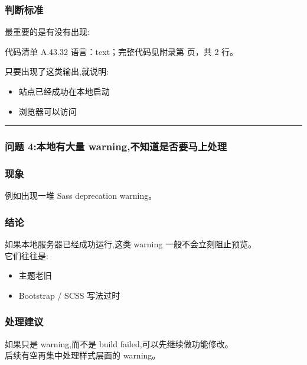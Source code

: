 \documentclass[lang=cn,scheme=chinese,color=blue,device=normal,toc=onecol,math=cm]{elegantbook}
\begin{document}
\subsubsection{判断标准}


最重要的是有没有出现:\par


\begin{codeindexbox}{代码清单 A.43.32}
语言：text；完整代码见附录第 \pageref{code:43:32} 页，共 2 行。
\end{codeindexbox}


只要出现了这类输出,就说明:\par


\begin{itemize}
\item 站点已经成功在本地启动
\item 浏览器可以访问
\end{itemize}


\medskip\hrule\medskip


\subsubsection{问题 4:本地有大量 warning,不知道是否要马上处理}


\subsubsection{现象}


例如出现一堆 Sass deprecation warning。\par


\subsubsection{结论}


如果本地服务器已经成功运行,这类 warning 一般不会立刻阻止预览。\\ 它们往往是:\par


\begin{itemize}
\item 主题老旧
\item Bootstrap /\allowbreak{} SCSS 写法过时
\end{itemize}


\subsubsection{处理建议}


如果只是 warning,而不是 build failed,可以先继续做功能修改。\\ 后续有空再集中处理样式层面的 warning。\par
\end{document}
